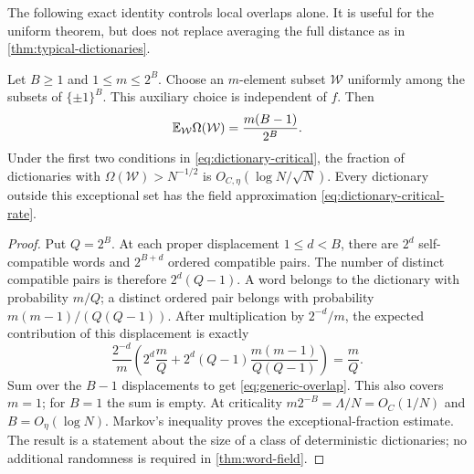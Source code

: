 The following exact identity controls local overlaps alone. It is useful
for the uniform theorem, but does not replace averaging the full
distance as in \cref{thm:typical-dictionaries}.

\begin{corollary}\label{cor:generic-dictionaries}
Let $B\ge1$ and $1\le m\le2^B$. Choose an $m$-element subset $\mathcal W$
uniformly among the subsets of $\{\pm1\}^B$.
This auxiliary choice is independent of $f$. Then
\begin{equation}\label{eq:generic-overlap}
 \mathbb E_{\mathcal W}\Omega(\mathcal W)=\frac{m(B-1)}{2^B}.
\end{equation}
Under the first two conditions in \eqref{eq:dictionary-critical}, the
fraction of dictionaries with $\Omega(\mathcal W)>N^{-1/2}$ is
$O_{C,\eta}(\log N/\sqrt N)$. Every dictionary outside this exceptional
set has the field approximation \eqref{eq:dictionary-critical-rate}.
\end{corollary}
\begin{proof}
Put $Q=2^B$. At each proper displacement $1\le d<B$, there are
$2^d$ self-compatible words and $2^{B+d}$ ordered compatible pairs.
The number of distinct compatible pairs is therefore $2^d(Q-1)$.
A word belongs to the dictionary with probability $m/Q$; a distinct
ordered pair belongs with probability $m(m-1)/(Q(Q-1))$.
After multiplication by $2^{-d}/m$, the expected contribution of this
displacement is exactly
\[
 \frac{2^{-d}}m\left(2^d\frac mQ
       +2^d(Q-1)\frac{m(m-1)}{Q(Q-1)}\right)=\frac mQ.
\]
Sum over the $B-1$ displacements to get \eqref{eq:generic-overlap}.
This also covers $m=1$; for $B=1$ the sum is empty.
At criticality $m2^{-B}=\Lambda/N=O_C(1/N)$ and $B=O_\eta(\log N)$.
Markov's inequality proves the exceptional-fraction estimate. The result
is a statement about the size of a class of deterministic dictionaries;
no additional randomness is required in \cref{thm:word-field}.
\end{proof}

